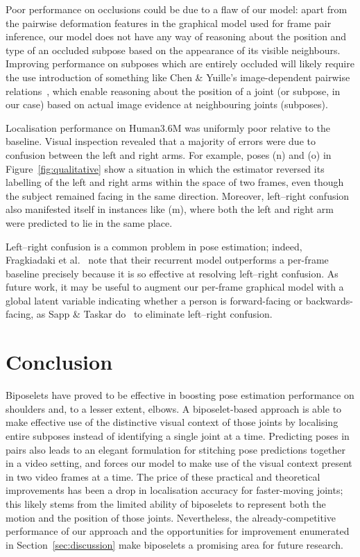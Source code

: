 \documentclass[runningheads]{llncs}
\begin{document}
Poor performance on occlusions could be due to a flaw of our model: apart from
the pairwise deformation features in the graphical model used for frame pair
inference, our model does not have any way of reasoning about the position and
type of an occluded subpose based on the appearance of its visible neighbours.
Improving performance on subposes which are entirely occluded will likely
require the use introduction of something like Chen \& Yuille's image-dependent
pairwise relations~\cite{chen2014articulated}, which enable reasoning about the
position of a joint (or subpose, in our case) based on actual image evidence at
neighbouring joints (subposes).

Localisation performance on Human3.6M was uniformly poor relative to the
baseline. Visual inspection revealed that a majority of errors were due to
confusion between the left and right arms. For example, poses (n) and (o) in
Figure~\ref{fig:qualitative} show a situation in which the estimator reversed
its labelling of the left and right arms within the space of two frames, even
though the subject remained facing in the same direction. Moreover, left--right
confusion also manifested itself in instances like (m), where both the left and
right arm were predicted to lie in the same place.

Left--right confusion is a common problem in pose estimation; indeed,
Fragkiadaki et al.~\cite{fragkiadaki2015recurrent} note that their recurrent
model outperforms a per-frame baseline precisely because it is so effective at
resolving left--right confusion. As future work, it may be useful to augment our
per-frame graphical model with a global latent variable indicating whether a
person is forward-facing or backwards-facing, as Sapp \& Taskar
do~\cite{sapp2013modec} to eliminate left--right confusion.

\section{Conclusion}

Biposelets have proved to be effective in boosting pose estimation performance
on shoulders and, to a lesser extent, elbows. A biposelet-based approach is able
to make effective use of the distinctive visual context of those joints by
localising entire subposes instead of identifying a single joint at a time.
Predicting poses in pairs also leads to an elegant formulation for stitching
pose predictions together in a video setting, and forces our model to make use
of the visual context present in two video frames at a time. The price of
these practical and theoretical improvements has been a drop in localisation
accuracy for faster-moving joints; this likely stems from the limited ability of
biposelets to represent both the motion and the position of those joints.
Nevertheless, the already-competitive performance of our approach and the
opportunities for improvement enumerated in Section~\ref{sec:discussion} make
biposelets a promising area for future research.
\end{document}
